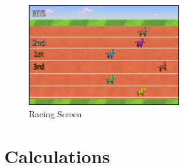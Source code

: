 \documentclass{article}
\begin{document}
\begin{figure}[h]
\centering
\includegraphics[width=6.5cm]{images/racescreen.png}
\caption{Racing Screen}
\end{figure}


\section{Calculations}
\end{document}
